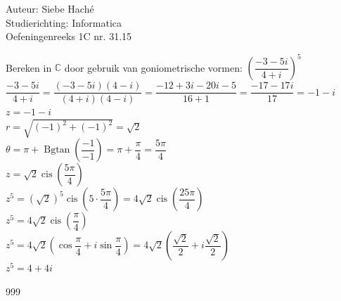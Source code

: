 \documentclass[a4paper]{article}
\begin{document}
\noindent \large Auteur: Siebe Haché \\
\noindent \large Studierichting: Informatica\\
\noindent \large Oefeningenreeks 1C nr. 31.15\\

\newcommand{\Bgtan}{\operatorname{Bgtan}}
\newcommand{\cis}{\operatorname{cis}}

\medskip
\normalsize
Bereken in $\mathbb{C}$ door gebruik van goniometrische vormen: $\left(\dfrac{-3-5i}{4+i}\right)^5$ \\

$\dfrac{-3-5i}{4+i} = \dfrac{(-3-5i)(4-i)}{(4+i)(4-i)} = \dfrac{-12+3i-20i-5}{16+1} = \dfrac{-17-17i}{17} = -1-i$ \\

$z = -1-i$ \\

$r = \sqrt{(-1)^2+(-1)^2} = \sqrt{2}$ \\

$\theta = \pi + \Bgtan\left(\dfrac{-1}{-1}\right) = \pi + \dfrac{\pi}{4} = \dfrac{5\pi}{4}$ \\

$z = \sqrt{2} \cis \left(\dfrac{5\pi}{4}\right)$ \\

$z^5 = \left(\sqrt{2}\right)^5 \cis \left(5 \cdot \dfrac{5\pi}{4}\right) = 4\sqrt{2} \cis \left(\dfrac{25\pi}{4}\right)$ \\

$z^5 = 4\sqrt{2} \cis \left(\dfrac{\pi}{4}\right)$ \\

$z^5 = 4\sqrt{2} \left(\cos \dfrac{\pi}{4} + i \sin \dfrac{\pi}{4}\right) = 4\sqrt{2} \left(\dfrac{\sqrt{2}}{2} + i \dfrac{\sqrt{2}}{2}\right)$ \\

$z^5 = 4 + 4i$ \\

\begin{thebibliography}{999}
\end{thebibliography}
\end{document}
